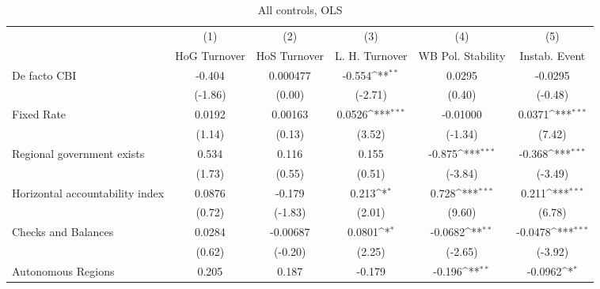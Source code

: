 \begin{table}[htbp]\centering
\def\sym#1{\ifmmode^{#1}\else\(^{#1}\)\fi}
\caption{All controls, OLS \label{fullcmultIndOLSDF}}
\begin{tabular}{l*{5}{c}}
\toprule
                                        &\multicolumn{1}{c}{(1)}&\multicolumn{1}{c}{(2)}&\multicolumn{1}{c}{(3)}&\multicolumn{1}{c}{(4)}&\multicolumn{1}{c}{(5)}\\
                                        &\multicolumn{1}{c}{HoG Turnover}&\multicolumn{1}{c}{HoS Turnover}&\multicolumn{1}{c}{L. H. Turnover}&\multicolumn{1}{c}{WB Pol. Stability}&\multicolumn{1}{c}{Instab. Event}\\
\midrule
De facto CBI                            &   -0.404         & 0.000477         &   -0.554\sym{**} &   0.0295         &  -0.0295         \\
                                        &  (-1.86)         &   (0.00)         &  (-2.71)         &   (0.40)         &  (-0.48)         \\
\addlinespace
Fixed Rate                              &   0.0192         &  0.00163         &   0.0526\sym{***}& -0.01000         &   0.0371\sym{***}\\
                                        &   (1.14)         &   (0.13)         &   (3.52)         &  (-1.34)         &   (7.42)         \\
\addlinespace
Regional government exists              &    0.534         &    0.116         &    0.155         &   -0.875\sym{***}&   -0.368\sym{***}\\
                                        &   (1.73)         &   (0.55)         &   (0.51)         &  (-3.84)         &  (-3.49)         \\
\addlinespace
Horizontal accountability index         &   0.0876         &   -0.179         &    0.213\sym{*}  &    0.728\sym{***}&    0.211\sym{***}\\
                                        &   (0.72)         &  (-1.83)         &   (2.01)         &   (9.60)         &   (6.78)         \\
\addlinespace
Checks and Balances                     &   0.0284         & -0.00687         &   0.0801\sym{*}  &  -0.0682\sym{**} &  -0.0478\sym{***}\\
                                        &   (0.62)         &  (-0.20)         &   (2.25)         &  (-2.65)         &  (-3.92)         \\
\addlinespace
Autonomous Regions                      &    0.205         &    0.187         &   -0.179         &   -0.196\sym{**} &  -0.0962\sym{*}  \\

\end{tabular}
\end{table}

